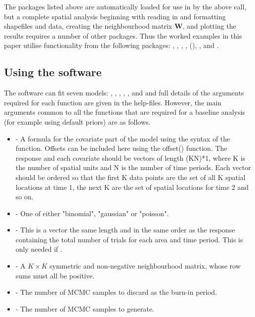 \documentclass[article, nojss]{jss}
\begin{document}
The packages listed above are automatically loaded for use in  by the above call, but a complete spatial analysis beginning with reading in and formatting shapefiles and data, creating the neighbourhood matrix $\mathbf{W}$, and plotting the results requires a number of other packages. Thus the worked examples in this paper utilise functionality from the following packages: , , , ,  (\citealp{maptools2015}), ,   and .


\subsection{Using the software}
The software can fit  seven models: , , , ,  , and  and full details of the arguments required for each function are given in the help-files. However, the main arguments common to all the functions  that are required for a baseline analysis (for example using default priors) are as follows.

\begin{itemize}
\item {} - A formula for the covariate part of the model using the syntax of the  function. Offsets can be included here using the offset() function. The response and each covariate should be vectors of length (KN)*1, where K is the number of spatial units and N is the number of time periods. Each vector should be ordered so that the first K data points are the set of all K spatial locations at time 1, the next K are the set of spatial locations for time 2 and so on. 

\item {} - One of either "binomial", "gaussian" or "poisson".


\item {} - This is a vector the same length and in the same order as the response containing the total number of trials  for each area and time period. This is only needed if  .

\item {} - A $K \times K$ symmetric and non-negative neighbourhood matrix, whose row sums must all be positive.

\item {} - The number of MCMC samples to discard as the burn-in period.
    
\item {} - The number of MCMC samples to generate.
\end{itemize}
\end{document}
